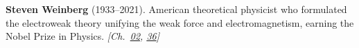 \nobelphysics \textbf{Steven Weinberg} (1933–2021). American theoretical physicist who formulated the electroweak theory unifying the weak force and electromagnetism, earning the Nobel Prize in Physics. \emph{[Ch.~\hyperref[ch:acceleratinguniverse]{02}, \hyperref[ch:qftvsgr]{36}]}

